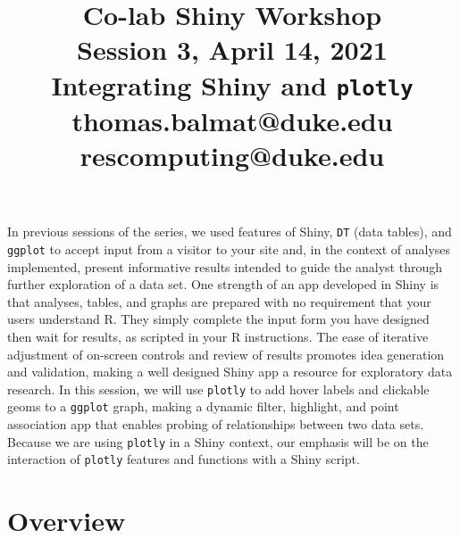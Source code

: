 \documentclass[10pt, letterpaper]{article}
\title{\Large Co-lab Shiny Workshop\\[6pt]
       \large Session 3, April 14, 2021\\[6pt]
       Integrating Shiny and \texttt{plotly}\\[20pt]
       \normalsize thomas.balmat@duke.edu\\[1pt]rescomputing@duke.edu}
\date{}
\begin{document}
    
\begin{spacing}{1.0}
    
\maketitle

\vspace{-20pt}


In previous sessions of the series, we used features of Shiny, \texttt{DT} (data tables), and \texttt{ggplot} to accept input from a visitor to your site and, in the context of analyses implemented, present informative results intended to guide the analyst through further exploration of a data set.  One strength of an app developed in Shiny is that analyses, tables, and graphs are prepared with no requirement that your users understand R.  They simply complete the input form you have designed then wait for results, as scripted in your R instructions.  The ease of iterative adjustment of on-screen controls and review of results promotes idea generation and validation, making a well designed Shiny app a resource for exploratory data research.  In this session, we will use \texttt{plotly} to add hover labels and clickable geoms to a \texttt{ggplot} graph, making a dynamic filter, highlight, and point association app that enables probing of relationships between two data sets.  Because we are using \texttt{plotly} in a Shiny context, our emphasis will be on the interaction of \texttt{plotly} features and functions with a Shiny script.


\section{Overview}


\end{spacing}
\end{document}
